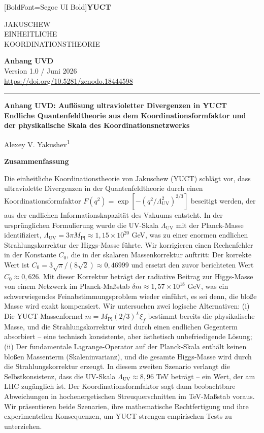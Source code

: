 \documentclass[11pt,a4paper]{article}
\newcommand{\Mpl}{M_{\mathrm{Pl}}}
\newcommand{\LUV}{\Lambda_{\mathrm{UV}}}
\theoremstyle{remark}
\newcommand{\makeheader}{%
	\noindent
	\begin{minipage}{0.17\textwidth}
		\raggedright
		{\fontspec{Segoe UI}[BoldFont=Segoe UI Bold]\bfseries\color{skyblue}\fontsize{46}{46}\selectfont YUCT}%
	\end{minipage}%
	\hspace{30pt}
	\begin{minipage}{0.32\textwidth}
		\raggedright
		{\sffamily\fontsize{11}{13}\selectfont JAKUSCHEW\\ EINHEITLICHE\\ KOORDINATIONSTHEORIE}%
	\end{minipage}%
	\hfill
	\begin{minipage}{0.38\textwidth}
		\raggedleft
		{\sffamily\bfseries Anhang UVD}\\ 
		{\sffamily Version 1.0 / Juni 2026}\\ 
		{\sffamily\footnotesize \url{https://doi.org/10.5281/zenodo.18444598}}%
	\end{minipage}
	\par\vspace{5pt}
	\noindent\textcolor{gold}{\rule{\textwidth}{1.6pt}}
	\par\vspace{0pt}
}
\begin{document}
	
	\thispagestyle{firstpage}
	\makeheader
	
	\vspace{0.5cm}
	{\LARGE\bfseries Anhang UVD: Auflösung ultravioletter Divergenzen in YUCT \\
		\Large Endliche Quantenfeldtheorie aus dem Koordinationsformfaktor und der physikalische Skala des Koordinationsnetzwerks \par}
	\vspace{0.3cm}
	
	{\large Alexey V. Yakushev\textsuperscript{1}} \\
	\vspace{0.2cm}
	
	{\color{darkblue}\textbf{\LARGE Zusammenfassung}} \par
	{\large
		\noindent
		Die einheitliche Koordinationstheorie von Jakuschew (YUCT) schlägt vor, dass ultraviolette Divergenzen in der Quantenfeldtheorie durch einen Koordinationsformfaktor \(F(q^2) = \exp[-(q^2/\LUV^2)^{2/3}]\) beseitigt werden, der aus der endlichen Informationskapazität des Vakuums entsteht. In der ursprünglichen Formulierung wurde die UV-Skala \(\LUV\) mit der Planck-Masse identifiziert, \(\LUV = 3\pi\Mpl \approx 1,15\times 10^{20}\) GeV, was zu einer enormen endlichen Strahlungskorrektur der Higgs-Masse führte. Wir korrigieren einen Rechenfehler in der Konstante \(C_0\), die in der skalaren Massenkorrektur auftritt: Der korrekte Wert ist \(C_0 = 3\sqrt{\pi}/(8\sqrt{2}) \approx 0,46999\) und ersetzt den zuvor berichteten Wert \(C_0 \approx 0,626\). Mit dieser Korrektur beträgt der radiative Beitrag zur Higgs-Masse von einem Netzwerk im Planck-Maßstab \(\delta m \approx 1,57\times 10^{18}\) GeV, was ein schwerwiegendes Feinabstimmungsproblem wieder einführt, es sei denn, die bloße Masse wird exakt kompensiert. Wir untersuchen zwei logische Alternativen: (i) Die YUCT-Massenformel \(m = \Mpl(2/3)^L\xi_f\) bestimmt bereits die physikalische Masse, und die Strahlungskorrektur wird durch einen endlichen Gegenterm absorbiert – eine technisch konsistente, aber ästhetisch unbefriedigende Lösung; (ii) Der fundamentale Lagrange-Operator auf der Planck-Skala enthält keinen bloßen Massenterm (Skaleninvarianz), und die gesamte Higgs-Masse wird durch die Strahlungskorrektur erzeugt. In diesem zweiten Szenario verlangt die Selbstkonsistenz, dass die UV-Skala \(\LUV \approx 8,96\) TeV beträgt – ein Wert, der am LHC zugänglich ist. Der Koordinationsformfaktor sagt dann beobachtbare Abweichungen in hochenergetischen Streuquerschnitten im TeV-Maßstab voraus. Wir präsentieren beide Szenarien, ihre mathematische Rechtfertigung und ihre experimentellen Konsequenzen, um YUCT strengen empirischen Tests zu unterziehen.
	}
	
\end{document}
